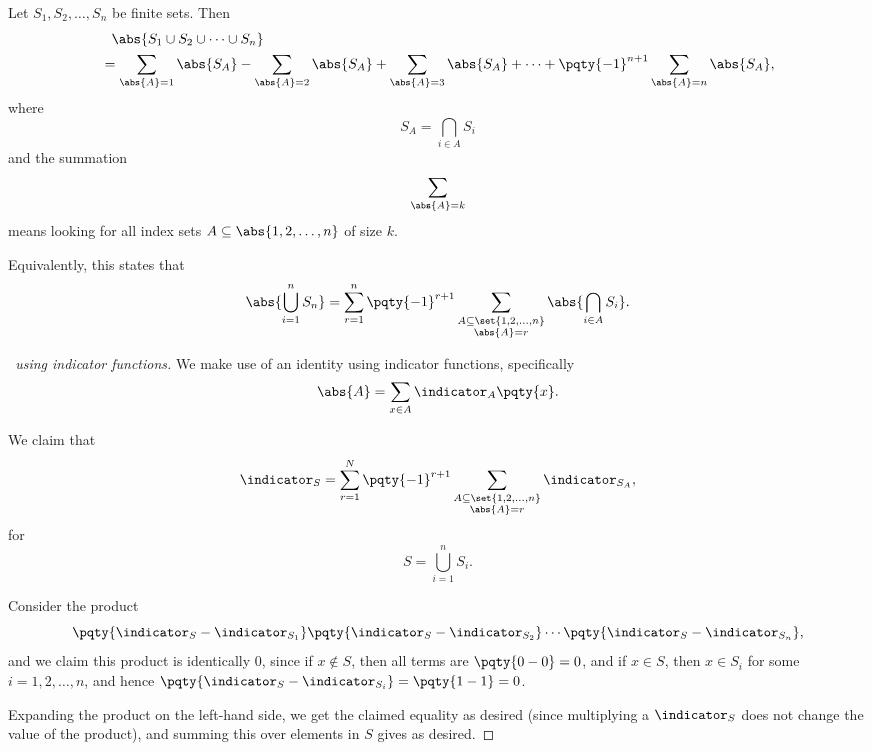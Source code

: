 \begin{theorem}
    Let \(S_1, S_2, \ldots, S_n\) be finite sets. Then
    \begin{align*}
        &\phantom{=} \abs{S_1 \cup S_2 \cup \cdots \cup S_n} \\
        &= \sum_{\abs{A} = 1} \abs{S_A} - \sum_{\abs{A} = 2} \abs{S_A} + \sum_{\abs{A} = 3} \abs{S_A} + \cdots + \pqty{-1}^{n + 1} \sum_{\abs{A} = n} \abs{S_A},
    \end{align*}
    where
    \[
        S_A = \bigcap_{i \in A} S_i
    \]
    and the summation
    \[
        \sum_{\abs{A} = k}
    \]
    means looking for all index sets \(A \subseteq \abs{1, 2, \ldots, n}\) of size \(k\).

    Equivalently, this states that
    \[
        \abs{\bigcup_{i = 1}^{n} S_n} = \sum_{r = 1}^{n} \pqty{-1}^{r + 1} \sum_{\substack{A \subseteq \set{1, 2, \ldots, n} \\ \abs{A} = r}} \abs{\bigcap_{i \in A} S_i}.
    \]
\end{theorem}

\begin{proof}[\proofname\ using indicator functions]
    We make use of an identity using indicator functions, specifically
    \[
        \abs{A} = \sum_{x \in A} \indicator_{A} \pqty{x}.
    \]

    We claim that
    \[
        \indicator_{S} = \sum_{r = 1}^{N} \pqty{-1}^{r + 1} \sum_{\substack{A \subseteq \set{1, 2, \ldots, n} \\ \abs{A} = r}} \indicator_{S_A},
    \]
    for
    \[
        S = \bigcup_{i = 1}^{n} S_i.
    \]

    Consider the product
    \[
        \pqty{\indicator_{S} - \indicator_{S_1}} \pqty{\indicator_{S} - \indicator_{S_2}} \cdots \pqty{\indicator_{S} - \indicator_{S_n}},
    \]
    and we claim this product is identically \(0\), since if \(x \notin S\), then all terms are \(\pqty{0 - 0} = 0\), and if \(x \in S\), then \(x \in S_i\) for some \(i = 1, 2, \ldots, n\), and hence \(\pqty{\indicator_{S} - \indicator_{S_i}} = \pqty{1 - 1} = 0\).

    Expanding the product on the left-hand side, we get the claimed equality as desired (since multiplying a \(\indicator_S\) does not change the value of the product), and summing this over elements in \(S\) gives as desired.
\end{proof}

